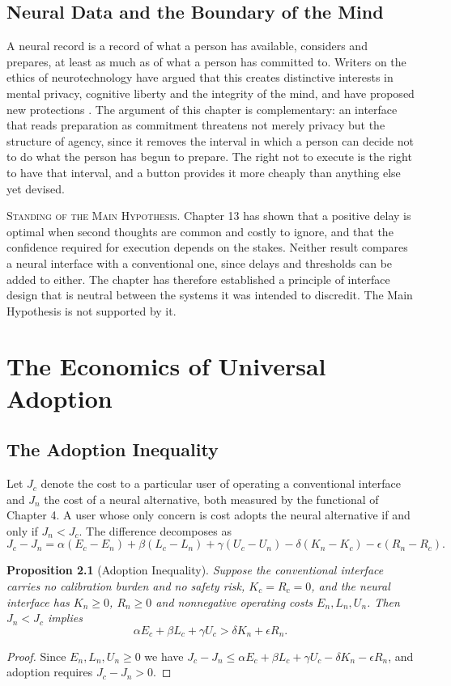 \documentclass[11pt,twoside,openany]{book}
\newtheorem{proposition}[theorem]{Proposition}
\theoremstyle{definition}
\theoremstyle{remark}
\newenvironment{standing}{\par\medskip\noindent\hrulefill\par\smallskip\noindent\textsc{Standing of the Main Hypothesis.}\enspace}{\par\smallskip\noindent\hrulefill\par\medskip}
\begin{document}
\section{Neural Data and the Boundary of the Mind}

A neural record is a record of what a person has available, considers and prepares, at least as much as of what a person has committed to. Writers on the ethics of neurotechnology have argued that this creates distinctive interests in mental privacy, cognitive liberty and the integrity of the mind, and have proposed new protections \cite{ienca2017,yuste2017}. The argument of this chapter is complementary: an interface that reads preparation as commitment threatens not merely privacy but the structure of agency, since it removes the interval in which a person can decide not to do what the person has begun to prepare. The right not to execute is the right to have that interval, and a button provides it more cheaply than anything else yet devised.

\begin{standing}
Chapter 13 has shown that a positive delay is optimal when second thoughts are common and costly to ignore, and that the confidence required for execution depends on the stakes. Neither result compares a neural interface with a conventional one, since delays and thresholds can be added to either. The chapter has therefore established a principle of interface design that is neutral between the systems it was intended to discredit. The Main Hypothesis is not supported by it.
\end{standing}

\chapter{The Economics of Universal Adoption}

\section{The Adoption Inequality}

Let $J_c$ denote the cost to a particular user of operating a conventional interface and $J_n$ the cost of a neural alternative, both measured by the functional of Chapter 4. A user whose only concern is cost adopts the neural alternative if and only if $J_n<J_c$. The difference decomposes as
\[
J_c-J_n=\alpha(E_c-E_n)+\beta(L_c-L_n)+\gamma(U_c-U_n)-\delta(K_n-K_c)-\epsilon(R_n-R_c).
\]

\begin{proposition}[Adoption Inequality]\label{prop:adopt}
Suppose the conventional interface carries no calibration burden and no safety risk, $K_c=R_c=0$, and the neural interface has $K_n\ge0$, $R_n\ge0$ and nonnegative operating costs $E_n,L_n,U_n$. Then $J_n<J_c$ implies
\[
\alpha E_c+\beta L_c+\gamma U_c>\delta K_n+\epsilon R_n.
\]
\end{proposition}
\begin{proof}
Since $E_n,L_n,U_n\ge0$ we have $J_c-J_n\le\alpha E_c+\beta L_c+\gamma U_c-\delta K_n-\epsilon R_n$, and adoption requires $J_c-J_n>0$.
\end{proof}
\end{document}
